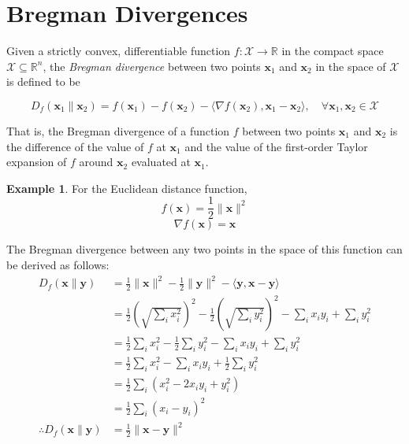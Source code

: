 \documentclass[10pt]{article}
\theoremstyle{definition}
\newtheorem{exmp}{Example}
\begin{document}
\section*{Bregman Divergences}

Given a strictly convex, differentiable function $f:\mathcal{X}\rightarrow \mathbb{R}$ in the compact space $\mathcal{X} \subseteq \mathbb{R}^n$, the \emph{Bregman divergence} between two points $\mathbf{x}_1$ and $\mathbf{x}_2$ in the space of $\mathcal{X}$ is defined to be

\begin{equation}
D_f(\mathbf{x}_1\lVert\mathbf{x}_2) = f(\mathbf{x}_1) - f(\mathbf{x}_2) - \langle\nabla f(\mathbf{x}_2), \mathbf{x}_1 - \mathbf{x}_2\rangle, \quad{} \forall \mathbf{x}_1,\mathbf{x}_2 \in \mathcal{X}
\end{equation}

\noindent
That is, the Bregman divergence of a function $f$ between two points $\mathbf{x}_1$ and $\mathbf{x}_2$ is the difference of the value of $f$ at $\mathbf{x}_1$ and the value of the first-order Taylor expansion of $f$ around $\mathbf{x}_2$ evaluated at $\mathbf{x}_1$.

\begin{exmp}

\noindent
For the Euclidean distance function, 
$$
f(\mathbf{x}) = \frac{1}{2} \lVert \mathbf{x} \rVert ^2
$$
$$
\nabla f(\mathbf{x}) = \mathbf{x}
$$

The Bregman divergence between any two points in the space of this function can be derived as follows:
\begin{equation}
\begin{aligned}
D_f(\mathbf{x}\lVert\mathbf{y}) & = \frac{1}{2} \lVert \mathbf{x} \rVert ^2 - \frac{1}{2} \lVert \mathbf{y} \rVert ^2 - \langle \mathbf{y}, \mathbf{x} - \mathbf{y} \rangle \\
& = \frac{1}{2}\left( \sqrt{\sum_i x_i^2} \right)^2 - \frac{1}{2}\left( \sqrt{\sum_i y_i^2} \right)^2
- \sum_i x_i y_i + \sum_i y_i^2 \\
& = \frac{1}{2}\sum_i x_i^2 - \frac{1}{2}\sum_i y_i^2 - \sum_i x_i y_i + \sum_i y_i^2 \\
& = \frac{1}{2}\sum_i x_i^2 - \sum_i x_i y_i + \frac{1}{2}\sum_i y_i^2 \\
& = \frac{1}{2}\sum_i (x_i^2 - 2 x_i y_i + y_i^2) \\
& = \frac{1}{2}\sum_i (x_i - y_i)^2 \\
\therefore D_f(\mathbf{x}\lVert\mathbf{y}) & = \frac{1}{2} \lVert \mathbf{x} - \mathbf{y} \rVert^2
\end{aligned}
\end{equation}

\end{exmp}
\end{document}
